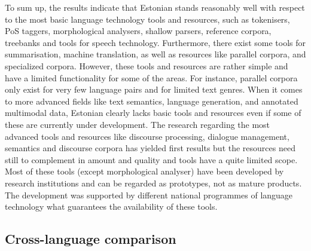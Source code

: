 \begin{multicols}{2}
\begin{itemize}
\end{itemize}

To sum up, the results indicate that Estonian stands reasonably well with respect to the most basic language technology tools and resources, such as tokenisers, PoS taggers, morphological analysers, shallow parsers, reference corpora, treebanks and tools for speech technology. Furthermore, there exist some tools for summarisation, machine translation, as well as resources like parallel corpora, and specialized corpora. However, these tools and resources are rather simple and have a limited functionality for some of the areas. For instance, parallel corpora only exist for very few language pairs and for limited text genres.
When it comes to more advanced fields like text semantics, language generation, and annotated multimodal data, Estonian clearly lacks basic tools and resources even if some of these are currently under development. 
The research regarding the most advanced tools and resources like discourse processing, dialogue management, semantics and discourse corpora has yielded first results but the resources need still to complement in amount and quality and tools have a quite limited scope.
Most of these tools (except morphological analyser) have been developed by research institutions and can be regarded as prototypes, not as mature products. The development was supported by different national programmes of language technology what guarantees the availability of these tools.

\subsection{Cross-language comparison}


\end{multicols}
